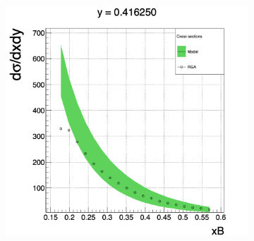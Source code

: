 \begin{figure}[h!]
\begin{subfigure}[b]{0.44\textwidth}
		\includegraphics[width=\linewidth]{figures/rga/xsec_1.png}
		\label{fig:rga_xsec1}
	\end{subfigure}
\end{figure}
